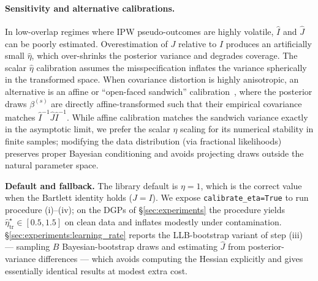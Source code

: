 \paragraph{Sensitivity and alternative calibrations.}
In low-overlap regimes where IPW pseudo-outcomes are highly volatile, $\widehat I$ and $\widehat J$ can be poorly estimated. Overestimation of $J$ relative to $I$ produces an artificially small $\hat{\eta}$, which over-shrinks the posterior variance and degrades coverage. The scalar $\hat{\eta}$ calibration assumes the misspecification inflates the variance spherically in the transformed space. When covariance distortion is highly anisotropic, an alternative is an affine or ``open-faced sandwich'' calibration~\citep{shaby2014openfaced,ribatet2012bayesian}, where the posterior draws $\beta^{(s)}$ are directly affine-transformed such that their empirical covariance matches $\widehat{I}^{-1}\widehat{J}\widehat{I}^{-1}$. While affine calibration matches the sandwich variance exactly in the asymptotic limit, we prefer the scalar $\eta$ scaling for its numerical stability in finite samples; modifying the data distribution (via fractional likelihoods) preserves proper Bayesian conditioning and avoids projecting draws outside the natural parameter space.

\textbf{Default and fallback.} The library default is
$\eta = 1$, which is the correct value when the Bartlett identity
holds ($J = I$). We expose
\texttt{calibrate\_eta=True} to run procedure (i)--(iv); on the
DGPs of \S\ref{sec:experiments} the procedure yields
$\hat\eta^\star_\mathrm{tr} \in [0.5, 1.5]$ on clean data and
inflates modestly under contamination.
\S\ref{sec:experiments:learning_rate} reports the LLB-bootstrap
variant of step (iii) --- sampling $B$ Bayesian-bootstrap draws and
estimating $\widehat J$ from posterior-variance differences --- which
avoids computing the Hessian explicitly and gives essentially
identical results at modest extra cost.

